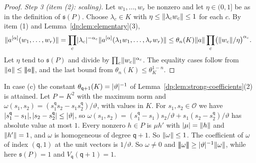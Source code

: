 \begin{proof}
\emph{Step 3 (item (2): scaling).} Let $w_1,\dots,w_r$ be nonzero and let $\eta\in(0,1]$ be as in the definition of $\mathfrak s(P)$. Choose $\lambda_c\in K$ with $\eta\le\lVert \lambda_cw_c\rVert\le1$ for each $c$. By item (1) and Lemma~\ref{dp:lem:elementary}(3),
\[
 \lVert a^{[\alpha]}(w_1,\dots,w_r)\rVert=\prod_c\lvert \lambda_c\rvert^{-\alpha_c}\lVert a^{[\alpha]}(\lambda_1w_1,\dots,\lambda_rw_r)\rVert\le\theta_n(K)\lVert a\rVert\prod_c\bigl(\lVert w_c\rVert/\eta\bigr)^{\alpha_c}.
\]
Let $\eta$ tend to $\mathfrak s(P)$ and divide by $\prod_c\lVert w_c\rVert^{\alpha_c}$. The equality cases follow from $\lVert a\rVert\le\lvert\!\lvert\!\lvert a\rvert\!\rvert\!\rvert$, and the last bound from $\theta_n(K)\le\theta_K^{1-n}$.
\end{proof}

\begin{remark}
In case (c) the constant $\theta_{\mathsf q+1}(K)=\lvert \vartheta\rvert^{-1}$ of Lemma~\ref{dp:lem:strong-coefficients}(2) is attained. Let $P=K^2$ with the maximum norm and $\omega(s_1,s_2)=(s_1^{\mathsf q}s_2-s_1s_2^{\mathsf q})/\vartheta$, with values in $K$. For $s_1,s_2\in\mathcal O$ we have $\lvert s_1^{\mathsf q}-s_1\rvert,\lvert s_2-s_2^{\mathsf q}\rvert\le\lvert \vartheta\rvert$, so $\omega(s_1,s_2)=(s_1^{\mathsf q}-s_1)s_2/\vartheta+s_1(s_2-s_2^{\mathsf q})/\vartheta$ has absolute value at most $1$. Every nonzero $h\in P$ is $\mu h'$ with $\lvert \mu\rvert=\lVert h\rVert$ and $\lVert h'\rVert=1$, and $\omega$ is homogeneous of degree $\mathsf q+1$. So $\lVert \omega\rVert\le1$. The coefficient of $\omega$ of index $(\mathsf q,1)$ at the unit vectors is $1/\vartheta$. So $\omega\ne0$ and $\lvert\!\lvert\!\lvert\omega\rvert\!\rvert\!\rvert\ge\lvert \vartheta\rvert^{-1}\lVert \omega\rVert$, while here $\mathfrak s(P)=1$ and $V_{\mathsf q}(\mathsf q+1)=1$.
\end{remark}
